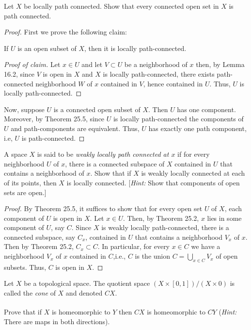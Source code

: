 \newpage
\begin{problem}[Munkres \S25, Ex.\,4]
Let $X$ be locally path connected. Show that every connected open
set in $X$ is path connected.
\end{problem}
\begin{proof}
First we prove the following claim:
\begin{claim*}
If $U$ is an open subset of $X$, then it is locally
path-connected.
\end{claim*}
\begin{proof}[Proof of claim]
\renewcommand\qedsymbol{$\spadesuit$}
Let $x\in U$ and let $V\subset U$ be a neighborhood of $x$ then,
by Lemma 16.2, since $V$ is open in $X$ and $X$ is locally
path-connected, there exists path-connected neighborhood $W$ of
$x$ contained in $V$, hence contained in $U$. Thus, $U$ is
locally path-connected.
\end{proof}
Now, suppose $U$ is a connected open subset of $X$. Then $U$ has
one component. Moreover, by Theorem 25.5, since $U$ is locally
path-connected the components of $U$ and path-components are
equivalent. Thus, $U$ has exactly one path component, i.e, $U$ is
path-connected.
\end{proof}
\newpage
\begin{problem}[Munkres \S25, Ex.\,6]
A space $X$ is said to be \emph{weakly locally path connected at
  $x$} if for every neighborhood $U$ of $x$, there is a connected
subspace of $X$ contained in $U$ that contains a neighborhood of
$x$. Show that if $X$ is weakly locally connected at each of its
points, then $X$ is locally connected. [\emph{Hint:} Show that
components of open sets are open.]
\end{problem}
\begin{proof}
By Theorem 25.5, it suffices to show that for every open set $U$
of $X$, each component of $U$ is open in $X$. Let $x\in U$. Then,
by Theorem 25.2, $x$ lies in some component of $U$, say
$C$. Since $X$ is weakly locally path-connected, there is a
connected subspace, say $C_x$, contained in $U$ that contains a
neighborhood $V_x$ of $x$. Then by Theorem 25.2, $C_x\subset
C$. In particular, for every $x\in C$ we have a neighborhood
$V_x$ of $x$ contained in $C$,i.e., $C$ is the union
$C=\bigcup_{x\in C}V_x$ of open subsets. Thus, $C$ is open in $X$.
\end{proof}
\newpage
\begin{problem}[A]
Let $X$ be a topological space. The quotient space
$(X\times[0,1])/(X\times 0)$ is called the \emph{cone} of $X$ and
denoted $CX$.
\\\\
Prove that if $X$ is homeomorphic to $Y$ then $CX$ is
homeomorphic to $CY$ (\emph{Hint:} There are maps in both
directions).
\end{problem}
